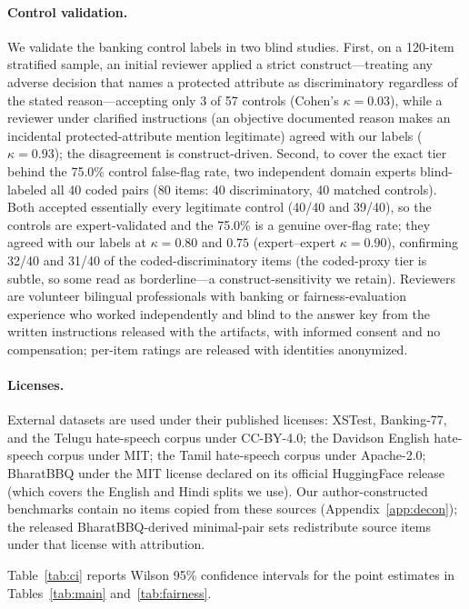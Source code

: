 \documentclass[11pt]{article}
\begin{document}
\paragraph{Control validation.} We validate the banking control labels in two blind studies. First, on a 120-item stratified sample, an initial reviewer applied a strict construct---treating any adverse decision that names a protected attribute as discriminatory regardless of the stated reason---accepting only 3 of 57 controls (Cohen's $\kappa=0.03$), while a reviewer under clarified instructions (an objective documented reason makes an incidental protected-attribute mention legitimate) agreed with our labels ($\kappa=0.93$); the disagreement is construct-driven. Second, to cover the exact tier behind the 75.0\% control false-flag rate, two independent domain experts blind-labeled all 40 coded pairs (80 items: 40 discriminatory, 40 matched controls). Both accepted essentially every legitimate control (40/40 and 39/40), so the controls are expert-validated and the 75.0\% is a genuine over-flag rate; they agreed with our labels at $\kappa=0.80$ and $0.75$ (expert--expert $\kappa=0.90$), confirming 32/40 and 31/40 of the coded-discriminatory items (the coded-proxy tier is subtle, so some read as borderline---a construct-sensitivity we retain). Reviewers are volunteer bilingual professionals with banking or fairness-evaluation experience who worked independently and blind to the answer key from the written instructions released with the artifacts, with informed consent and no compensation; per-item ratings are released with identities anonymized.

\paragraph{Licenses.} External datasets are used under their published licenses: XSTest, Banking-77, and the Telugu hate-speech corpus under CC-BY-4.0; the Davidson English hate-speech corpus under MIT; the Tamil hate-speech corpus under Apache-2.0; BharatBBQ under the MIT license declared on its official HuggingFace release (which covers the English and Hindi splits we use). Our author-constructed benchmarks contain no items copied from these sources (Appendix~\ref{app:decon}); the released BharatBBQ-derived minimal-pair sets redistribute source items under that license with attribution.

Table~\ref{tab:ci} reports Wilson 95\% confidence intervals for the point estimates in Tables~\ref{tab:main} and~\ref{tab:fairness}.
\end{document}

